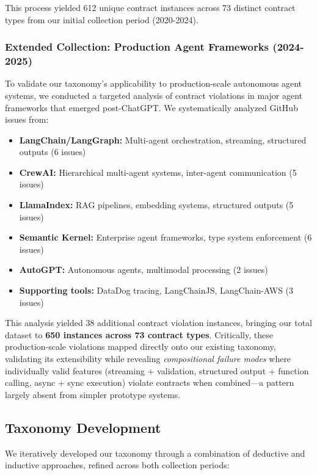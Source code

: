 \documentclass[11pt]{article}
\begin{document}
This process yielded 612 unique contract instances across 73 distinct contract types from our initial collection period (2020-2024).

\subsubsection{Extended Collection: Production Agent Frameworks (2024-2025)}

To validate our taxonomy's applicability to production-scale autonomous agent systems, we conducted a targeted analysis of contract violations in major agent frameworks that emerged post-ChatGPT. We systematically analyzed GitHub issues from:

\begin{itemize}
    \item \textbf{LangChain/LangGraph:} Multi-agent orchestration, streaming, structured outputs (6 issues)
    \item \textbf{CrewAI:} Hierarchical multi-agent systems, inter-agent communication (5 issues)
    \item \textbf{LlamaIndex:} RAG pipelines, embedding systems, structured outputs (5 issues)
    \item \textbf{Semantic Kernel:} Enterprise agent frameworks, type system enforcement (6 issues)
    \item \textbf{AutoGPT:} Autonomous agents, multimodal processing (2 issues)
    \item \textbf{Supporting tools:} DataDog tracing, LangChainJS, LangChain-AWS (3 issues)
\end{itemize}

This analysis yielded 38 additional contract violation instances, bringing our total dataset to \textbf{650 instances across 73 contract types}. Critically, these production-scale violations mapped directly onto our existing taxonomy, validating its extensibility while revealing \textit{compositional failure modes} where individually valid features (streaming + validation, structured output + function calling, async + sync execution) violate contracts when combined—a pattern largely absent from simpler prototype systems.

\subsection{Taxonomy Development}

We iteratively developed our taxonomy through a combination of deductive and inductive approaches, refined across both collection periods:
\end{document}
